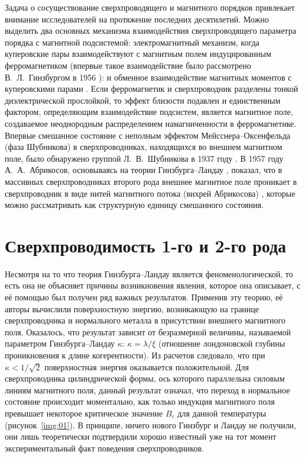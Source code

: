 Задача о сосуществование сверхпроводящего и магнитного порядков привлекает 
внимание исследователей на протяжение последних десятилетий. Можно выделить 
два основных механизма взаимодействия сверхпроводящего параметра порядка с 
магнитной подсистемой: электромагнитный механизм, когда куперовские пары 
взаимодействуют с магнитным полем индуцированным ферромагнетиком (впервые 
такое взаимодействие было рассмотрено В.~Л.~Гинзбургом в 1956 
\cite{ginzburg}): и обменное взаимодействие магнитных моментов с куперовскими 
парами \cite{buzdin,bulaev}. Если ферромагнетик и сверхпроводник разделены 
тонкой диэлектрической прослойкой, то эффект близости подавлен и единственным 
фактором, определяющим взаимодействие подсистем, является магнитное поле, 
создаваемое неоднородным распределением намагниченности в ферромагнетике.
Впервые смешанное состояние с неполным эффектом Мейсснера--Оксенфельда 
(фаза Шубникова) в сверхпроводниках, находящихся во внешнем магнитном поле, 
было обнаружено группой Л.~В.~Шубникова в 1937 году \cite{shubnikov}. В 1957 
году А.~А.~Абрикосов, основываясь на теории Гинзбурга--Ландау 
\cite{ginzburg-landau}, показал, что в массивных сверхпроводниках второго рода 
внешнее магнитное поле проникает в сверхпроводник в виде нитей магнитного 
потока (вихрей Абрикосова) \cite{abrikosov}, которые можно рассматривать как 
структурную единицу смешанного состояния.

\section{Сверхпроводимость 1-го и 2-го рода}

Несмотря на то что теория Гинзбурга–Ландау является феноменологической, то 
есть она не объясняет причины возникновения явления, которое она описывает, с 
её помощью был получен ряд важных результатов. Применив эту теорию, её авторы 
вычислили поверхностную энергию, возникающую на границе сверхпроводника и 
нормального металла в присутствии внешнего магнитного поля. Оказалось, что 
результат зависит от безразмерной величины, называемой параметром 
Гинзбурга–Ландау \( \kappa \): \( \kappa = \lambda/\xi \) (отношение 
лондоновской глубины проникновения к длине когерентности). Из расчетов 
следовало, что при \( \kappa < 1/\sqrt{2} \) поверхностная энергия оказывается 
положительной. Для сверхпроводника цилиндрической формы, ось которого 
параллельна силовым линиям магнитного поля, данный результат означал, что 
переход в нормальное состояние происходит моментально, как только индукция 
магнитного поля превышает некоторое критическое значение \( B_c \) для данной 
температуры (рисунок~\ref{img:01}). В принципе, ничего нового Гинзбург и 
Ландау не получили, они лишь теоретически подтвердили хорошо известный уже на 
тот момент экспериментальный факт поведения сверхпроводников.

